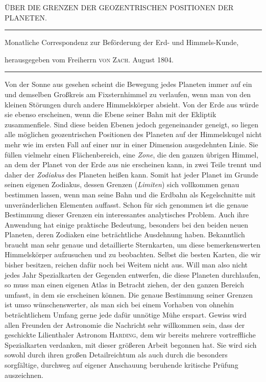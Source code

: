 \clearpage{}%
\begin{center}
{\small ÜBER DIE GRENZEN DER GEOZENTRISCHEN POSITIONEN DER PLANETEN.\par}
\medskip\hrule\medskip
{\small Monatliche Correspondenz zur Beförderung der Erd- und Himmels-Kunde,\par
herausgegeben vom Freiherrn \textsc{von Zach}. August 1804.\par}
\medskip\hrule
\end{center}\medskip
Von der Sonne aus gesehen scheint die Bewegung jedes Planeten immer
auf ein und demselben Großkreis am Fixsternhimmel zu verlaufen, wenn man
von den kleinen Störungen durch andere Himmelskörper absieht. Von der
Erde aus würde sie ebenso erscheinen, wenn die Ebene seiner Bahn mit
der Ekliptik zusammenfiele. Sind diese beiden Ebenen jedoch gegeneinander
geneigt, so liegen alle möglichen geozentrischen Positionen des Planeten
auf der Himmelskugel nicht mehr wie im ersten Fall auf einer nur in
einer Dimension ausgedehnten Linie. Sie füllen vielmehr einen
Flächenbereich, eine \textit{Zone}, die den ganzen übrigen Himmel, an
dem der Planet von der Erde aus nie erscheinen kann, in zwei Teile
trennt und daher der \textit{Zodiakus} des Planeten heißen kann. Somit
hat jeder Planet im Grunde seinen eigenen Zodiakus, dessen Grenzen
(\textit{Limiten}) sich vollkommen genau bestimmen lassen, wenn man
seine Bahn und die Erdbahn als Kegelschnitte mit unveränderlichen
Elementen auffasst. Schon für sich genommen ist die genaue Bestimmung
dieser Grenzen ein interessantes analytisches Problem. Auch ihre
Anwendung hat einige praktische Bedeutung, besonders bei den beiden neuen
Planeten, deren Zodiaken eine beträchtliche Ausdehnung haben. Bekanntlich
braucht man sehr genaue und detaillierte Sternkarten, um diese
bemerkenswerten Himmelskörper aufzusuchen und zu beobachten. Selbst die
besten Karten, die wir bisher
%
besitzen, reichen dafür noch bei Weitem nicht aus. Will man also nicht
jedes Jahr Spezialkarten der Gegenden entwerfen, die diese Planeten
durchlaufen, so muss man einen eigenen Atlas in Betracht ziehen, der
den ganzen Bereich umfasst, in dem sie erscheinen können. Die genaue
Bestimmung seiner Grenzen ist umso wünschenswerter, als man sich bei
einem Vorhaben von ohnehin beträchtlichem Umfang gerne jede dafür
unnötige Mühe erspart. Gewiss wird allen Freunden der Astronomie die
Nachricht sehr willkommen sein, dass der geschickte Lilienthaler
Astronom \textsc{Harding}, dem wir bereits mehrere vortreffliche
Spezialkarten verdanken, mit dieser größeren Arbeit begonnen hat. Sie
wird sich sowohl durch ihren großen Detailreichtum als auch durch die
besonders sorgfältige, durchweg auf eigener Anschauung beruhende
kritische Prüfung auszeichnen.

